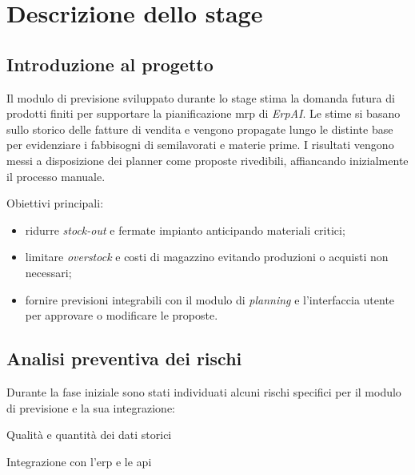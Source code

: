 \chapter{Descrizione dello stage}
\label{chap:descrizione-stage}

\section{Introduzione al progetto}
Il modulo di previsione sviluppato durante lo stage stima la domanda futura di prodotti finiti per supportare la pianificazione \gls{mrp} di \textit{ErpAI}. Le stime si basano sullo storico delle fatture di vendita e vengono propagate lungo le distinte base per evidenziare i fabbisogni di semilavorati e materie prime. I risultati vengono messi a disposizione dei planner come proposte rivedibili, affiancando inizialmente il processo manuale.

Obiettivi principali:
\begin{itemize}
    \item ridurre \textit{stock-out} e fermate impianto anticipando materiali critici;
    \item limitare \textit{overstock} e costi di magazzino evitando produzioni o acquisti non necessari;
    \item fornire previsioni integrabili con il modulo di \textit{planning} e l’interfaccia utente per approvare o modificare le proposte.
\end{itemize}


\section{Analisi preventiva dei rischi}

Durante la fase iniziale sono stati individuati alcuni rischi specifici per il modulo di previsione e la sua integrazione:

\begin{risk}{Qualità e quantità dei dati storici}
    \label{risk:data-quality}
\end{risk}

\begin{risk}{Integrazione con l’\gls{erp} e le \gls{api}}
    \label{risk:integration-api}
\end{risk}

